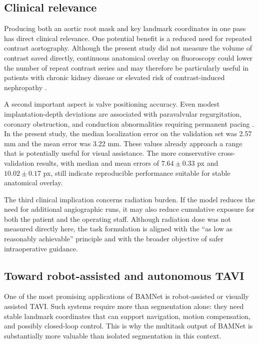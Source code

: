 \documentclass[preprint,12pt,authoryear]{elsarticle}
\begin{document}
\subsection{Clinical relevance}

Producing both an aortic root mask and key landmark coordinates in one pass has direct clinical relevance. One potential benefit is a reduced need for repeated contrast aortography. Although the present study did not measure the volume of contrast saved directly, continuous anatomical overlay on fluoroscopy could lower the number of repeat contrast series and may therefore be particularly useful in patients with chronic kidney disease or elevated risk of contrast-induced nephropathy \citep{dangas2020_tavi,yamamoto2021_tavi}.

A second important aspect is valve positioning accuracy. Even modest implantation-depth deviations are associated with paravalvular regurgitation, coronary obstruction, and conduction abnormalities requiring permanent pacing \citep{pibarot2021_pvl,jilaihawi2022_coronary,kammler2016_implantdepth}. In the present study, the median localization error on the validation set was 2.57 mm and the mean error was 3.22 mm. These values already approach a range that is potentially useful for visual assistance. The more conservative cross-validation results, with median and mean errors of $7.64 \pm 0.33$ px and $10.02 \pm 0.17$ px, still indicate reproducible performance suitable for stable anatomical overlay.

The third clinical implication concerns radiation burden. If the model reduces the need for additional angiographic runs, it may also reduce cumulative exposure for both the patient and the operating staff. Although radiation dose was not measured directly here, the task formulation is aligned with the ``as low as reasonably achievable'' principle and with the broader objective of safer intraoperative guidance.

\subsection{Toward robot-assisted and autonomous TAVI}

One of the most promising applications of BAMNet is robot-assisted or visually assisted TAVI. Such systems require more than segmentation alone: they need stable landmark coordinates that can support navigation, motion compensation, and possibly closed-loop control. This is why the multitask output of BAMNet is substantially more valuable than isolated segmentation in this context.
\end{document}
